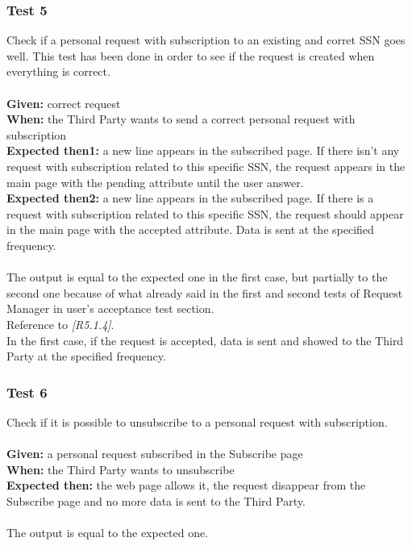 \subsubsection{\Large{Test 5}}
Check if a personal request with subscription to an existing and corret SSN goes well. This test has been done in order to see if the request is created when everything is correct.\\
\\
\textbf{Given: } correct request  \\
\textbf{When: } the Third Party wants to send a correct personal request with subscription\\
\textbf{Expected then1: } a new line appears in the subscribed page. If there isn't any request with subscription related to this specific SSN, the request appears in the main page with the pending attribute until the user answer.\\
\textbf{Expected then2: } a new line appears in the subscribed page. If there is a request with subscription related to this specific SSN, the request should appear in the main page with the accepted  attribute. Data is sent at the specified frequency.\\
\\
The output is equal to the expected one in the first case, but partially to the second one because of what already said in the first and second tests of Request Manager in user's acceptance test section.\\ 
Reference to \textit{[R5.1.4]}.\\
In the first case, if the request is accepted, data is sent and showed to the Third Party at the specified frequency.

\subsubsection{\Large{Test 6}}
Check if it is possible to unsubscribe to a personal request with subscription.\\
\\
\textbf{Given: } a personal request subscribed in the Subscribe page \\
\textbf{When: } the Third Party wants to unsubscribe\\
\textbf{Expected then: } the web page allows it, the request disappear from the Subscribe page and no more data is sent to the Third Party.\\
\\
The output is equal to the expected one.

